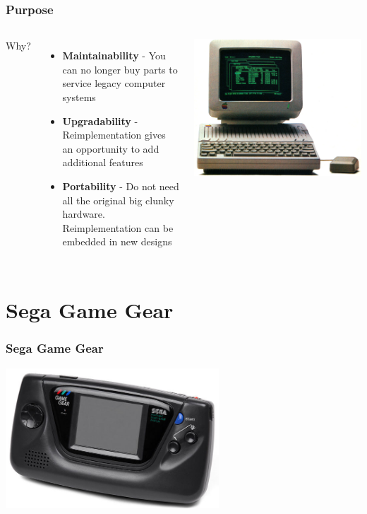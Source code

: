 \documentclass{beamer}
\newlength{\wideitemsep}
\let\olditem\item
\renewcommand{\item}{\setlength{\itemsep}{\wideitemsep}\olditem}
\begin{document}
\begin{frame}
    \frametitle{Purpose}

    \begin{columns}[c]
            Why?
            \begin{itemize}
                \item<2-> \textbf{Maintainability} - You can no longer buy parts to service legacy computer systems
                \item<3-> \textbf{Upgradability} - Reimplementation gives an opportunity to add additional features
                \item<4-> \textbf{Portability} - Do not need all the original big clunky hardware. Reimplementation can
                    be embedded in new designs
            \end{itemize}

            \includegraphics[width=\textwidth]{apple_2.jpg}
    \end{columns}
\end{frame}

\section{Sega Game Gear}
\begin{frame}
    \frametitle{Sega Game Gear}
    \begin{center}
        \includegraphics[width=0.6\textwidth]{gg.jpg}
    \end{center}
\end{frame}
\end{document}
